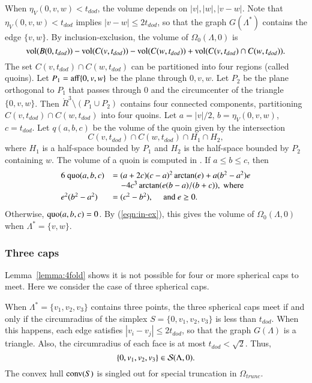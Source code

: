 \documentclass{article} %
\begin{document}
When $\eta_V(0,v,w) < t_{dod}$, the volume depends on
$|v|,|w|,|v-w|$.  Note that $\eta_V(0,v,w) < t_{dod}$ implies
$|v-w|\le 2t_{dod}$, so that the graph $G(\Lambda^*)$ contains
the edge $\{v,w\}$.
By inclusion-exclusion, the volume of $\Omega_0(\Lambda,0)$ is
\begin{equation}\label{eqn:in-ex}
  {\operatorname{vol}}(B(0,t_{dod})) - {\operatorname{vol}}(C(v,t_{dod})) - {\operatorname{vol}}(C(w,t_{dod})) +
  {\operatorname{vol}}(C(v,t_{dod}) \cap C(w,t_{dod})).
\end{equation}
The set $C(v,t_{dod})\cap C(w,t_{dod})$ can be partitioned into four
regions (called quoins). Let $P_1={\operatorname{aff}}\{0,v,w\}$ be the plane through $0,v,w$. Let
$P_2$ be the plane orthogonal to $P_1$ that passes through $0$ and the
circumcenter of the triangle $\{0,v,w\}$. Then $\ring{R}^3\setminus
(P_1\cup P_2)$ contains four connected components, partitioning
$C(v,t_{dod})\cap C(w,t_{dod})$ into four quoins. Let $a=|v|/2$,
$b=\eta_V(0,v,w)$, $c=t_{dod}$. Let $q(a,b,c)$ be the volume of the
quoin given by the intersection
$$C(v,t_{dod})\cap C(w,t_{dod}) \cap H_1 \cap H_2,$$
where $H_1$ is a half-space bounded by $P_1$ and $H_2$ is
the half-space bounded by $P_2$ containing $w$.
The volume of a quoin is computed in \cite[\S7.3]{Hales:2006:DCG}.
If $a\le b\le c$, then 
\begin{equation}
\begin{array}{lll}
6\ {\operatorname{quo}}(a,b,c) &= (a+2c) (c-a)^2 \arctan(e) + a(b^2-a^2) e \\
&\quad - 4c^3 \arctan(e(b-a)/(b+c)),\text{ where}\\ [0.5ex]
e^2 (b^2-a^2)&= (c^2 - b^2), \quad \text{ and } e\ge 0.
\end{array}
\end{equation}
Otherwise, ${\operatorname{quo}}(a,b,c) = 0$.  By (\ref{eqn:in-ex}), this gives
the volume of $\Omega_0(\Lambda,0)$ when $\Lambda^*=\{v,w\}$.

\subsubsection{Three caps}

Lemma~\ref{lemma:4fold} shows it is not possible for four or more
spherical caps to meet.  Here we consider the case of three spherical
caps.

When $\Lambda^*=\{v_1,v_2,v_3\}$ contains three points, the three
spherical caps meet if and only if the circumradius of the simplex
$S=\{0,v_1,v_2,v_3\}$ is less than $t_{dod}$. When this happens, each
edge satisfies $|v_i-v_j|\le 2t_{dod}$, so that the graph $G(\Lambda)$ is a
triangle. Also, the circumradius of each face is at most $t_{dod} <
\sqrt2$. Thus,
$$\{0,v_1,v_2,v_3\}\in{\mathcal S}(\Lambda,0).$$
The convex hull ${\operatorname{conv}}(S)$ is singled out for special truncation in
$\Omega_{trunc}$.
\end{document}
